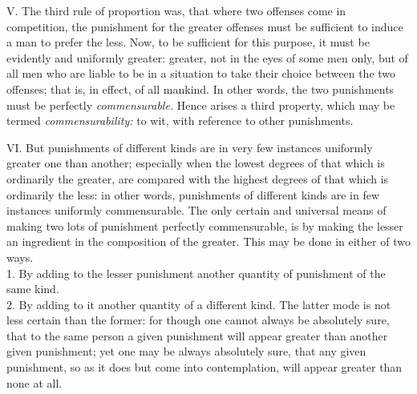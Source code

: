 \documentclass[12pt]{report}
\begin{document}
V. The third rule of proportion was, that where two offenses come in
competition, the punishment for the greater offenses must be sufficient
to induce a man to prefer the less. Now, to be sufficient for this
purpose, it must be evidently and uniformly greater: greater, not in the
eyes of some men only, but of all men who are liable to be in a
situation to take their choice between the two offenses; that is, in
effect, of all mankind. In other words, the two punishments must be
perfectly \emph{commensurable.} Hence arises a third property, which may
be termed \emph{commensurability:} to wit, with reference to other
punishments.

VI. But punishments of different kinds are in very few instances
uniformly greater one than another; especially when the lowest degrees
of that which is ordinarily the greater, are compared with the highest
degrees of that which is ordinarily the less: in other words,
punishments of different kinds are in few instances uniformly
commensurable. The only certain and universal means of making two lots
of punishment perfectly commensurable, is by making the lesser an
ingredient in the composition of the greater. This may be done in either
of two ways.\\
1. By adding to the lesser punishment another quantity of punishment of
the same kind.\\
2. By adding to it another quantity of a different kind. The latter mode
is not less certain than the former: for though one cannot always be
absolutely sure, that to the same person a given punishment will appear
greater than another given punishment; yet one may be always absolutely
sure, that any given punishment, so as it does but come into
contemplation, will appear greater than none at all.
\end{document}
